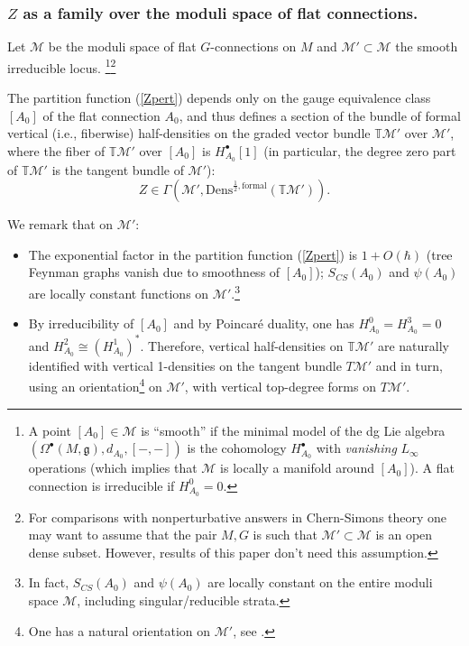\documentclass[11pt,a4paper]{amsart}
\theoremstyle{plain} %
\theoremstyle{definition}
\theoremstyle{remark}
\newcommand{\g}{\mathfrak{g}}
\newcommand{\mr}{\mathrm}
\newcommand{\bt}{\bullet}
\newcommand{\M}{\mathcal{M}}
\newcommand{\mc}{\mathcal}
\begin{document}
\subsubsection{$Z$ as a family over the moduli space of flat connections.}
Let $\M$ be the moduli space of flat $G$-connections on $M$ and $\M'\subset \M$ the smooth irreducible locus.
\footnote{A point $[A_0]\in \M$ is ``smooth'' if 
the minimal model of the 
dg Lie algebra $(\Omega^\bt(M,\g),d_{A_0},[-,-])$ is the cohomology $H^\bt_{A_0}$ with \emph{vanishing} $L_\infty$ operations 
(which implies that $\M$ is locally a manifold around $[A_0]$). A flat connection is irreducible if $H^0_{A_0}=0$.}\footnote{
For comparisons with nonperturbative answers in Chern-Simons theory one may want to assume that the pair $M,G$ is such that $\M'\subset \M$ is an open dense subset. However, results of this paper don't need this assumption.}

The partition function (\ref{Zpert}) depends only on the gauge equivalence class $[A_0]$ of the flat connection $A_0$, and thus defines a section of the bundle of formal vertical (i.e., fiberwise) half-densities on the graded vector bundle $\mathbb{T}\M'$ over $\M'$, where the fiber of $\mathbb{T}\M'$ over $[A_0]$ is $H^\bt_{A_0}[1]$ (in particular, the degree zero part of $\mathbb{T}\M'$ is the tangent bundle of $\M'$):
\begin{equation}
    Z\in \Gamma(\M',\mr{Dens}^{\frac12,\mr{formal}}(\mathbb{T}\M')).
\end{equation}

We remark that on $\M'$: 
\begin{itemize}
\item The exponential factor in the partition function (\ref{Zpert}) is $1+O(\hbar)$ (tree Feynman graphs vanish%
due to smoothness of $[A_0]$); $S_{CS}(A_0)$ and $\psi(A_0)$ are locally constant functions on $\M'$.\footnote{In fact, $S_{CS}(A_0)$ and $\psi(A_0)$ are locally constant on the entire moduli space $\M$, including singular/reducible strata.}
\item By irreducibility of $[A_0]$ and by Poincar\'e duality, one has $H^0_{A_0}=H^3_{A_0}=0$ and $H^2_{A_0}\cong (H^1_{A_0})^*$. Therefore, vertical half-densities on $\mathbb{T}\M'$ are naturally identified with vertical 1-densities on the tangent bundle $T\M'$ and in turn, using an orientation\footnote{One has a natural orientation on $\M'$, see \cite[Theorem 4.5]{joyce2020orientations}. %
} on $\M'$, with vertical top-degree forms on $T\M'$.
\end{itemize}
\end{document}
